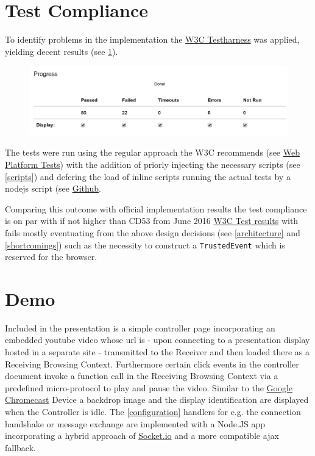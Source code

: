\documentclass[journal]{IEEEtran}
\begin{document}
\section{Test Compliance}
\label{test compliance}

To identify problems in the implementation the \href{https://github.com/w3c/web-platform-tests/tree/master/presentation-api}{W3C Testharness} was applied, yielding decent results (see  \ref{test-results}).

\begin{figure}[!t]
\centering\label{test-results}
\includegraphics[width=6.5in]{img/test-results.png}
\end{figure}

The tests were run using the regular approach the W3C recommends (see \href{https://github.com/w3c/web-platform-tests}{Web Platform Tests}) with the addition of priorly injecting the necessary scripts (see  \ref{scripts}) and defering the load of inline scripts running the actual tests by a nodejs script (see \href{https://github.com/ltetzlaff/inject-dependencies}{Github}.

Comparing this outcome with official implementation results the test compliance is on par with if not higher than CD53 from June 2016 \href{https://w3c.github.io/test-results/presentation-api/controlling-ua/all.html}{W3C Test results} with fails mostly eventuating from the above design decisions (see  \ref{architecture} and  \ref{shortcomings}) such as the necessity to construct a  {\lstinline[style=inline]$TrustedEvent$} which is reserved for the browser.

\newpage

\section{Demo}
\label{demo}
Included in the presentation is a simple controller page incorporating an embedded youtube video whose url is - upon connecting to a presentation display hosted in a separate site - transmitted to the Receiver and then loaded there as a Receiving Browsing Context. Furthermore certain click events in the controller document invoke a function call in the Receiving Browsing Context via a predefined micro-protocol to play and pause the video. Similar to the \href{https://google.com/chromecast}{Google Chromecast} Device a backdrop image and the display identification are displayed when the Controller is idle. The  \ref{configuration} handlers for e.g. the connection handshake or message exchange are implemented with a Node.JS app incorporating a hybrid approach of \href{https://socket.io}{Socket.io} and a more compatible ajax fallback.
\end{document}
